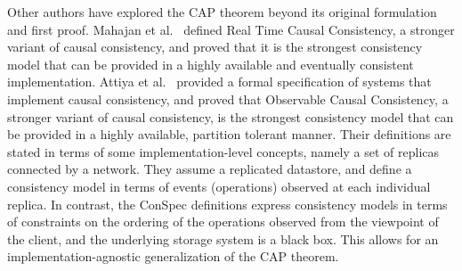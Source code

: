 \documentclass[conference]{IEEEtran}
\begin{document}
	Other authors have explored the CAP theorem beyond its original formulation and first proof.
	Mahajan et al.~\cite{mahajan11cacTR} defined Real Time Causal Consistency, a stronger variant of causal consistency, and proved that it is the strongest consistency model that can be provided in a highly available and eventually consistent implementation.
	Attiya et al.~\cite{Attiya:2015:LHE:2767386.2767419}  provided a formal specification of systems that implement causal consistency, and proved that Observable Causal Consistency, a stronger variant of causal consistency, is the strongest consistency model that can be provided in a highly available, partition tolerant manner. Their definitions are stated in terms of some implementation-level concepts, namely a set of replicas connected by a network. They assume a replicated datastore, and define a consistency model in terms of events (operations) observed at each individual replica. %
	In contrast, the ConSpec definitions express consistency models in terms of constraints on the ordering of the operations observed from the viewpoint of the client, and the underlying storage system is a black box. This allows for an implementation-agnostic generalization of the CAP theorem.
	
\end{document}
